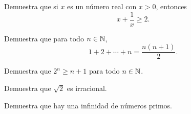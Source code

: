 \documentclass[12pt,a4paper]{article}
\begin{document}

    \begin{ejercicio}[2]
        Demuestra que si $x$ es un número real con $x>0$, entonces
        \begin{equation*}
            x+\frac{1}{x}\geq2.
        \end{equation*}
    \end{ejercicio}


    \begin{ejercicio}[2]
        Demuestra que para todo $n\in\mathbb{N}$,
        \begin{equation*}
            1+2+\cdots+n=\frac{n(n+1)}{2}.
        \end{equation*}
    \end{ejercicio}

    \begin{ejercicio}[2]
        Demuestra que $2^n\geq n+1$ para todo $n\in\mathbb{N}$.
    \end{ejercicio}


    \begin{ejercicio}[3]
        Demuestra que $\sqrt{2}$ es irracional.
    \end{ejercicio}

    \begin{ejercicio}[3]
        Demuestra que hay una infinidad de números primos.
    \end{ejercicio}

    \bitacora
\end{document}
